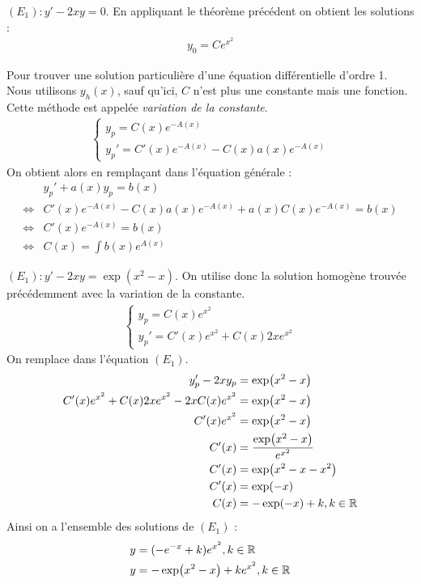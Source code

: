 \begin{example}
    $(E_1) : y' - 2xy = 0$.
    En appliquant le théorème précédent on obtient les solutions :
    \begin{align*}
        y_0 = Ce^{x^2}
    \end{align*}
\end{example}

\begin{proposition}
    Pour trouver une solution particulière d'une équation différentielle d'ordre 1. Nous utilisons $y_{h}(x)$, sauf qu'ici, $C$ n'est plus une constante mais une fonction. Cette méthode est appelée \emph{variation de la constante}.
    \begin{align*}
        \begin{cases}
            y_{p} = C(x)e^{-A(x)} \\
            y_{p}' = C'(x)e^{-A(x)} - C(x)a(x)e^{-A(x)}
        \end{cases}
    \end{align*}
    On obtient alors en remplaçant dans l'équation générale :
    \begin{align*}
        &y_{p}' + a(x) y_{p} = b(x) \\
        \iff &C'(x)e^{-A(x)} - C(x)a(x) e^{-A(x)} + a(x)C(x)e^{-A(x)} = b(x) \\
        \iff &C'(x) e^{-A(x)} = b(x) \\
        \iff &C(x) = \int b(x) e^{A(x)}
    \end{align*}
\end{proposition}

\begin{example}
    $(E_1) : y' - 2xy = \exp(x^2 - x)$.
    On utilise donc la solution homogène trouvée précédemment avec la variation de la constante.
    \begin{align*}
        \begin{cases}
            y_p = C(x) e^{x^2} \\ 
            y_p' = C'(x) e^{x^2} + C(x)2x e^{x^2}
        \end{cases}
    \end{align*}
    On remplace dans l'équation $(E_1)$.
    \begin{align*}
        y_p' - 2x y_p &= \exp(x^2 - x) \\
        C'(x) e^{x^2} + C(x)2x e^{x^2} - 2x C(x)e^{x^2} &= \exp(x^2 - x) \\
        C'(x)e^{x^2} &= \exp(x^2 - x) \\ 
        C'(x) &= \frac{\exp(x^2 - x)}{e^{x^2}} \\
        C'(x) &= \exp(x^2 - x - x^2) \\
        C'(x) &= \exp(-x) \\
        C(x) &= -\exp(-x) + k, k \in \mathbb{R}
    \end{align*}
    Ainsi on a l'ensemble des solutions de $(E_1)$ :
    \begin{align*}
        y &= (-e^{-x} + k) e^{x^2}, k \in \mathbb{R} \\
        y &= -\exp(x^2 - x) + ke^{x^2}, k \in \mathbb{R}
    \end{align*}
\end{example}

